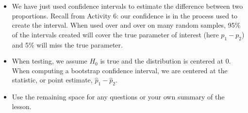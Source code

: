 \begin{itemize}
\begin{itemize}
    \end{itemize}
  \item We have just used confidence intervals 
    to estimate the difference between two proportions.  Recall from
    Activity 6: our confidence is in the process used to create the
    interval.  When used over and over on many random samples, 95\% of
    the intervals created will cover the true parameter of interest
    (here $p_1 - p_2$) and 5\% will miss the true parameter.

  \item When testing, we assume $H_0$ is true and the distribution is
    centered at 0.  When computing a bootstrap confidence interval, we
    are centered at the statistic, or point estimate, $\widehat{p}_1 -
    \widehat{p}_2$. 
 \item 
  Use the remaining space for any questions or your own summary of the
  lesson. 

  \end{itemize}



